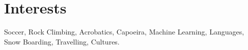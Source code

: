 \documentclass[10pt, a4paper]{report}
\begin{document}
\section*{Interests}
Soccer, Rock Climbing, Acrobatics, Capoeira, Machine Learning, Languages, Snow Boarding, Travelling, Cultures.

%
%
%
%

\pagebreak

\setlength{\topmargin}{-1.5in}
\setlength{\oddsidemargin}{-1in}
\end{document}
